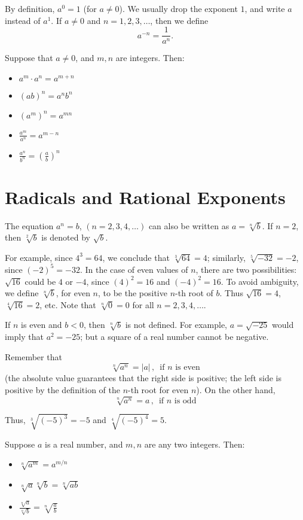 \documentclass{ximera}
\begin{document}
By definition, $a^0 = 1$ (for $a \neq 0$).  We usually drop the exponent $1$, and write $a$ instead of $a^1$.  If $a \neq 0$ and $n = 1, 2, 3, \ldots$,
then we define \[ a^{-n} = \frac{1}{a^n}. \]

\begin{theorem}
Suppose that $a\neq 0$, and $m,n$ are integers. Then:
  \begin{itemize}
	  \item $a^m \cdot a^n = a^{m+n}$
    \item $(ab)^n = a^n b^n$
    \item $\left(a^m\right)^n = a^{mn}$
    \item $\frac{a^m}{a^n} = a^{m-n}$
    \item $\frac{a^n}{b^n} = \left( \frac{a}{b} \right)^n$
  \end{itemize}
\end{theorem}

\section{Radicals and Rational Exponents}
The equation $a^n = b$, $(n=2,3,4,\ldots)$ can also be written as $a=\sqrt[n]{b}$.  If $n=2$, then $\sqrt[2]{b}$ is denoted by $\sqrt{b}$.

For example, since $4^3 = 64$, we conclude that $\sqrt[3]{64}=4$; similarly, $\sqrt[5]{-32}=-2$, since $(-2)^5 = -32$.  In the case of even values of $n$,
there are two possibilities: $\sqrt{16}$ could be $4$ or $-4$, since $(4)^2 = 16$ and $(-4)^2=16$.  To avoid ambiguity, we define $\sqrt[n]{b}$, for even $n$,
to be the positive $n$-th root of $b$.  Thus $\sqrt{16}=4$, $\sqrt[4]{16}=2$, etc.  Note that $\sqrt[n]{0} = 0$ for all $n=2,3,4,\ldots$.

If $n$ is even and $b<0$, then $\sqrt[n]{b}$ is not defined.  For example, $a=\sqrt{-25}$ would imply that $a^2 = -25$; but a square of a real number cannot be negative.

Remember that \[\sqrt[n]{a^n} = |a| \, , \,\,\, \textrm{if } n \textrm{ is even} \]
(the absolute value guarantees that the right side is positive; the left side is positive by the definition of the $n$-th root for even $n$).  On the
other hand, \[\sqrt[n]{a^n} = a \, , \,\,\, \textrm{if } n \textrm{ is odd} \]

Thus, $\sqrt[3]{(-5)^3} = -5$ and $\sqrt[4]{(-5)^4} = 5$.

\begin{theorem}
  Suppose $a$ is a real number, and $m, n$ are any two integers. Then:
  \begin{itemize}
    \item $\sqrt[n]{a^m} = a^{m/n}$
    \item $\sqrt[n]{a} \sqrt[n]{b} = \sqrt[n]{ab}$
    \item $\frac{\sqrt[n]{a}}{\sqrt[n]{b}} = \sqrt[n]{\frac{a}{b}}$
  \end{itemize}
\end{theorem}
\end{document}
